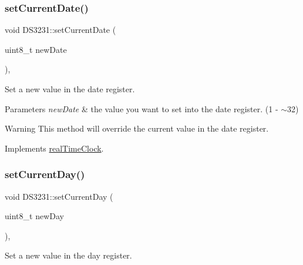 \mbox{\label{class_d_s3231_a597a0d5cb33f8b60f81dba9050ca1363}} 
\subsubsection{\texorpdfstring{set\+Current\+Date()}{setCurrentDate()}}
{\footnotesize\ttfamily void D\+S3231\+::set\+Current\+Date (\begin{DoxyParamCaption}\item[{uint8\+\_\+t}]{new\+Date }\end{DoxyParamCaption})\hspace{0.3cm}{\ttfamily [override]}, {\ttfamily [virtual]}}



Set a new value in the date register. 


\begin{DoxyParams}{Parameters}
{\em new\+Date} & the value you want to set into the date register. (1 -\/ $\sim$32) \\
\hline
\end{DoxyParams}
\begin{DoxyWarning}{Warning}
This method will override the current value in the date register. 
\end{DoxyWarning}


Implements \mbox{\hyperlink{classreal_time_clock_a7db563a518ae7b87ca6d77860906e517}{real\+Time\+Clock}}.

\mbox{\label{class_d_s3231_ae43a887db6022008c066a257acd68ae8}} 
\subsubsection{\texorpdfstring{set\+Current\+Day()}{setCurrentDay()}}
{\footnotesize\ttfamily void D\+S3231\+::set\+Current\+Day (\begin{DoxyParamCaption}\item[{uint8\+\_\+t}]{new\+Day }\end{DoxyParamCaption})\hspace{0.3cm}{\ttfamily [override]}, {\ttfamily [virtual]}}



Set a new value in the day register. 


